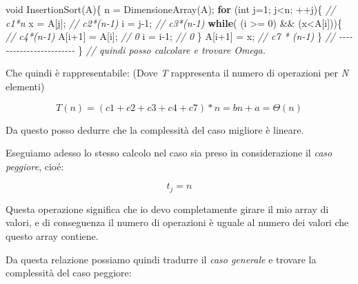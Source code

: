 \documentclass[
]{article}
\newenvironment{Shaded}{}{}
\newcommand{\CommentTok}[1]{\textcolor[rgb]{0.38,0.63,0.69}{\textit{#1}}}
\newcommand{\ControlFlowTok}[1]{\textcolor[rgb]{0.00,0.44,0.13}{\textbf{#1}}}
\newcommand{\DataTypeTok}[1]{\textcolor[rgb]{0.56,0.13,0.00}{#1}}
\newcommand{\DecValTok}[1]{\textcolor[rgb]{0.25,0.63,0.44}{#1}}
\newcommand{\NormalTok}[1]{#1}
\begin{document}
\begin{Shaded}
\begin{Highlighting}[]
\DataTypeTok{void}\NormalTok{ InsertionSort(A)\{}
\NormalTok{    n = DimensioneArray(A);}
    \ControlFlowTok{for}\NormalTok{ (}\DataTypeTok{int}\NormalTok{ j=}\DecValTok{1}\NormalTok{; j\textless{}n; ++j)\{		  }\CommentTok{// c1*n}
\NormalTok{        x = A[j];				  	 }\CommentTok{// c2*(n{-}1)}
\NormalTok{        i = j{-}}\DecValTok{1}\NormalTok{;				   	 }\CommentTok{// c3*(n{-}1)}
        \ControlFlowTok{while}\NormalTok{( (i \textgreater{}= }\DecValTok{0}\NormalTok{) \&\& (x\textless{}A[i]))\{ }\CommentTok{// c4*(n{-}1)}
\NormalTok{            A[i+}\DecValTok{1}\NormalTok{] = A[i];			 }\CommentTok{// 0}
\NormalTok{            i = i{-}}\DecValTok{1}\NormalTok{;  				}\CommentTok{// 0}
\NormalTok{        \}}
\NormalTok{        A[i+}\DecValTok{1}\NormalTok{] = x;					}\CommentTok{// c7 * (n{-}1)}
\NormalTok{    \}							 }\CommentTok{// {-}{-}{-}{-}{-}{-}{-}{-}{-}{-}{-}{-}{-}{-}{-}{-}{-}{-}{-}{-}{-}{-}{-}{-}}
\NormalTok{\}								}\CommentTok{// quindi posso calcolare e trovare Omega.}
\end{Highlighting}
\end{Shaded}

Che quindi è rappresentabile: (Dove \emph{T} rappresenta il numero di
operazioni per \emph{N} elementi)

\[T(n) = (c1+c2+c3+c4+c7) * n = bn + a = Θ(n)\]

Da questo posso dedurre che la complessità del caso migliore è lineare.

Eseguiamo adesso lo stesso calcolo nel caso sia preso in considerazione
il \emph{caso peggiore}, cioé:

\[t_j = n\]

Questa operazione significa che io devo completamente girare il mio
array di valori, e di conseguenza il numero di operazioni è uguale al
numero dei valori che questo array contiene.

Da questa relazione possiamo quindi tradurre il \emph{caso generale} e
trovare la complessità del caso peggiore:
\end{document}
